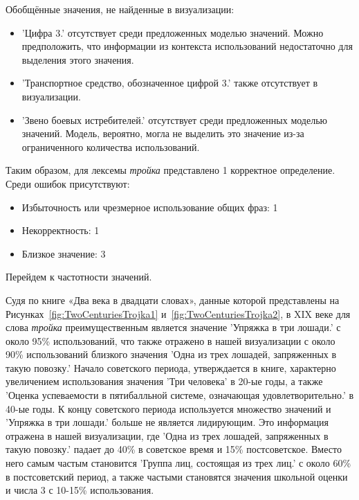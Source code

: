 \documentclass[LI,VKR]{HSEUniversity}
\begin{document}
Обобщённые значения, не найденные в визуализации:
\begin{itemize}
    \item ’Цифра 3.’ отсутствует среди предложенных моделью значений.  %
Можно предположить, что информации из контекста использований недостаточно для выделения этого значения.

    \item ’Транспортное средство, обозначенное цифрой 3.’ также отсутствует в визуализации.

    \item ’Звено боевых истребителей.’ отсутствует среди предложенных моделью значений.  %
Модель, вероятно, могла не выделить это значение из-за ограниченного количества использований.
\end{itemize}

Таким образом, для лексемы \textit{тройка} представлено 1 корректное определение.
Среди ошибок присутствуют:
\begin{itemize}
    \item Избыточность или чрезмерное использование общих фраз: 1
    \item Некорректность: 1
    \item Близкое значение: 3
\end{itemize}

Перейдем к частотности значений.

Судя по книге «Два века в двадцати словах»,
данные которой представлены на Рисунках~\ref{fig:TwoCenturiesTrojka1} и~\ref{fig:TwoCenturiesTrojka2}, в XIX веке для слова \textit{тройка}
преимущественным является значение ’Упряжка в три лошади.’ с около 95\% использований,
что также отражено в нашей визуализации с около 90\% использований близкого значения
’Одна из трех лошадей, запряженных в такую повозку.’
Начало советского периода, утверждается в книге, характерно увеличением использования значения
’Три человека’ в 20-ые годы, а также ’Оценка успеваемости в пятибалльной системе, означающая удовлетворительно.’
в 40-ые годы.
К концу советского периода используется множество значений и
’Упряжка в три лошади.’ больше не является
лидирующим.
Это информация отражена в нашей визуализации, где ’Одна из трех лошадей, запряженных в такую повозку.’
падает до 40\% в советское время и 15\% постсоветское.
Вместо него самым частым становится ’Группа лиц, состоящая из трех лиц.’ с около 60\%
в постсоветский период, а также частыми становятся значения школьной оценки
и числа 3 с 10-15\% использования.
\end{document}
